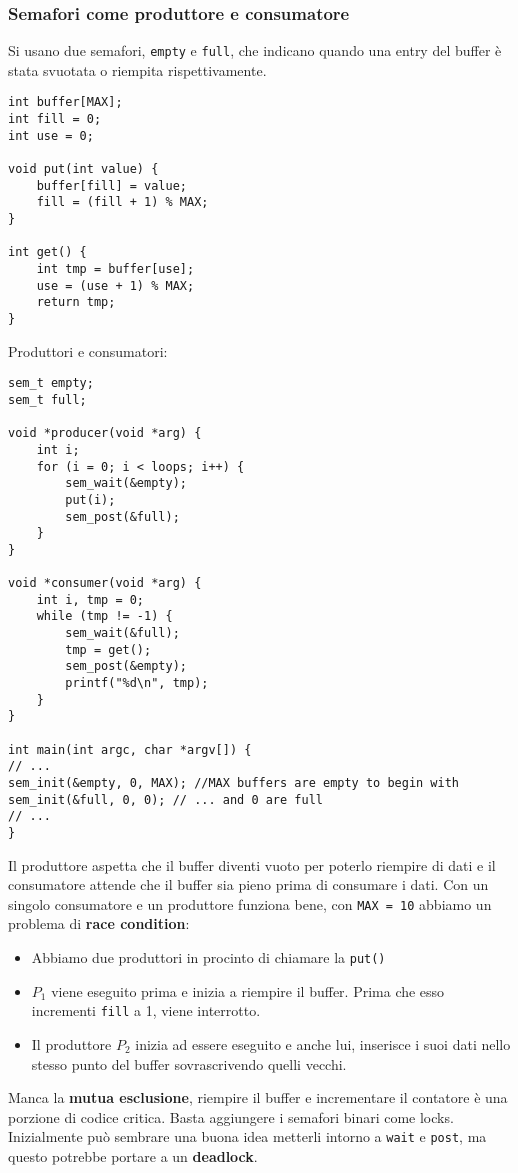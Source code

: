 \documentclass[12pt, twoside, letterpaper]{article}
\begin{document}
			\subsubsection{Semafori come produttore e consumatore}
				Si usano due semafori, \texttt{empty} e \texttt{full}, che indicano quando una entry del buffer è stata svuotata o riempita rispettivamente.
				\begin{lstlisting}[style=CStyle]
int buffer[MAX];
int fill = 0;
int use = 0;

void put(int value) {
	buffer[fill] = value;
	fill = (fill + 1) % MAX; 
}

int get() {
	int tmp = buffer[use];
	use = (use + 1) % MAX;
	return tmp;
}				\end{lstlisting}
				Produttori e consumatori: 
				\begin{lstlisting}[style=CStyle]
sem_t empty;
sem_t full;

void *producer(void *arg) {
	int i;
	for (i = 0; i < loops; i++) {
		sem_wait(&empty);
		put(i);
		sem_post(&full);
	}
}

void *consumer(void *arg) {
	int i, tmp = 0;
	while (tmp != -1) {
		sem_wait(&full);
		tmp = get();
		sem_post(&empty);
		printf("%d\n", tmp);
	}
}

int main(int argc, char *argv[]) {
// ...
sem_init(&empty, 0, MAX); //MAX buffers are empty to begin with
sem_init(&full, 0, 0); // ... and 0 are full
// ...
}				\end{lstlisting}
				Il produttore aspetta che il buffer diventi vuoto per poterlo riempire di dati e il consumatore attende che il buffer sia pieno prima di consumare i dati. Con un singolo consumatore e un produttore funziona bene, con \texttt{MAX = 10} abbiamo un problema di \textbf{race condition}:
				\begin{itemize}
					\item Abbiamo due produttori in procinto di chiamare la \texttt{put()}
					\item $P_1$ viene eseguito prima e inizia a riempire il buffer. Prima che esso incrementi \texttt{fill} a 1, viene interrotto. 
					\item Il produttore $P_2$ inizia ad essere eseguito e anche lui, inserisce i suoi dati nello stesso punto del buffer sovrascrivendo quelli vecchi. 
				\end{itemize}
				Manca la \textbf{mutua esclusione}, riempire il buffer e incrementare il contatore è una porzione di codice critica. Basta aggiungere i semafori binari come locks. Inizialmente può sembrare una buona idea metterli intorno a \texttt{wait} e \texttt{post}, ma questo potrebbe portare a un \textbf{deadlock}. 
\end{document}
